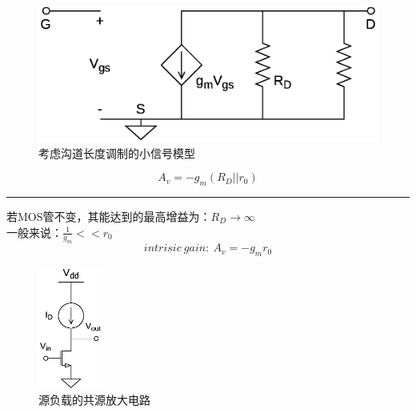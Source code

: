 \documentclass[twoside,a4paper,openright,titlepage,draft]{ctexrep}
\begin{document}
\begin{multicols}{2}
    \begin{figure}[H]
        \centering
        \includegraphics[width=\columnwidth]{commonsourcer0.eps}
        \caption{考虑沟道长度调制的小信号模型}
        \label{fig:共源有沟道调制小信号}
    \end{figure}
    \columnbreak
    \begin{equation}
        A_v = -g_m(R_D || r_0)
    \end{equation}
\end{multicols}\par
\hrule
\begin{multicols}{2}
    \begin{flushleft}
        若MOS管不变，其能达到的最高增益为：$R_D\rightarrow \infty$ \\
        一般来说：$\frac{1}{g_m} << r_0$ \\
        \begin{equation}
            intrisic\ gain:\ A_v = - g_mr_0
        \end{equation}
    \end{flushleft} 
    \columnbreak
    \begin{figure}[H]
        \centering
        \includegraphics[height=40mm]{sourceload.eps}
        \caption{源负载的共源放大电路}
        \label{fig:源负载的共源放大电路}
    \end{figure}     
\end{multicols}
\end{document}
